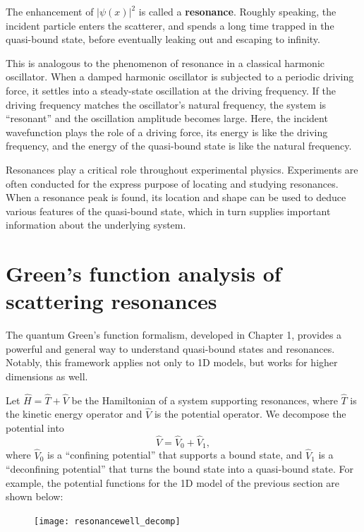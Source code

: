 \documentclass[pra,12pt]{revtex4}
\begin{document}
\noindent
The enhancement of $|\psi(x)|^2$ is called a \textbf{resonance}.
Roughly speaking, the incident particle enters the scatterer, and
spends a long time trapped in the quasi-bound state, before eventually
leaking out and escaping to infinity.

This is analogous to the phenomenon of resonance in a classical
harmonic oscillator.  When a damped harmonic oscillator is subjected
to a periodic driving force, it settles into a steady-state
oscillation at the driving frequency.  If the driving frequency
matches the oscillator's natural frequency, the system is ``resonant''
and the oscillation amplitude becomes large.  Here, the incident
wavefunction plays the role of a driving force, its energy is like the
driving frequency, and the energy of the quasi-bound state is like the
natural frequency.

Resonances play a critical role throughout experimental physics.
Experiments are often conducted for the express purpose of locating
and studying resonances.  When a resonance peak is found, its location
and shape can be used to deduce various features of the quasi-bound
state, which in turn supplies important information about the
underlying system.

\section{Green's function analysis of scattering resonances}
\label{sec:green_resonances}

The quantum Green's function formalism, developed in Chapter 1,
provides a powerful and general way to understand quasi-bound states
and resonances.  Notably, this framework applies not only to 1D
models, but works for higher dimensions as well.

Let $\hat{H} = \hat{T} + \hat{V}$ be the Hamiltonian of a system
supporting resonances, where $\hat{T}$ is the kinetic energy operator
and $\hat{V}$ is the potential operator.  We decompose the potential
into
\begin{equation}
  \hat{V} = \hat{V}_0 + \hat{V}_1,
  \label{Vdecomp}
\end{equation}
where $\hat{V}_0$ is a ``confining potential'' that supports a bound
state, and $\hat{V}_1$ is a ``deconfining potential'' that turns the
bound state into a quasi-bound state.  For example, the potential
functions for the 1D model of the previous section are shown below:

\begin{figure}[h]
  \centering\texttt{[image: resonancewell\_decomp]}
\end{figure}
\end{document}
